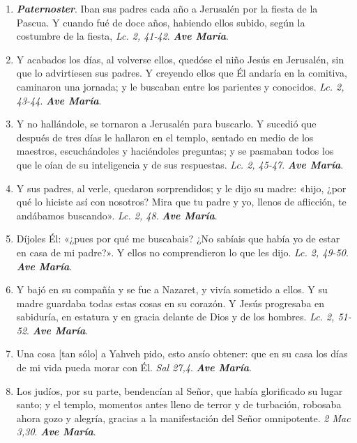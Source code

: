\documentclass[../../devocionario.tex]{subfiles}
\begin{document}
    \begin{enumerate}
        \item \textbf{\textit{Paternoster}}. Iban sus padres cada año a Jerusalén por la fiesta de la Pascua. 
            Y cuando fué de doce años, habiendo ellos subido, según la costumbre de la fiesta, \textit{Lc. 2, 41-42}. \textbf{\textit{Ave María}}.

        \item Y acabados los días, al volverse ellos, quedóse el niño Jesús en Jerusalén, sin que lo advirtiesen sus padres. 
            Y creyendo ellos que Él andaría en la comitiva, caminaron una jornada; 
            y le buscaban entre los parientes y conocidos. \textit{Lc. 2, 43-44}. \textbf{\textit{Ave María}}.

        \item Y no hallándole, se tornaron a Jerusalén para buscarlo. Y sucedió que después de tres días le hallaron en el templo, 
            sentado en medio de los maestros, escuchándoles y haciéndoles preguntas; 
            y se pasmaban todos los que le oían de su inteligencia y de sus respuestas. \textit{Lc. 2, 45-47}. \textbf{\textit{Ave María}}.

        \item Y sus padres, al verle, quedaron sorprendidos; y le dijo su madre: «hijo, ¿por qué lo hiciste así con nosotros? 
            Mira que tu padre y yo, llenos de aflicción, te andábamos buscando». \textit{Lc. 2, 48}. \textbf{\textit{Ave María}}.

        \item Díjoles Él: «¿pues por qué me buscabais? ¿No sabíais que había yo de estar en casa de mi padre?». 
            Y ellos no comprendieron lo que les dijo. \textit{Lc. 2, 49-50}. \textbf{\textit{Ave María}}.

        \item Y bajó en su compañía y se fue a Nazaret, y vivía sometido a ellos. Y su madre guardaba todas estas cosas en su corazón. 
            Y Jesús progresaba en sabiduría, en estatura y en gracia delante de Dios y de los hombres. \textit{Lc. 2, 51-52}. \textbf{\textit{Ave María}}.

        \item Una cosa [tan sólo] a Yahveh pido, esto ansío obtener: que en su casa los días de mi vida pueda morar con Él. \textit{Sal 27,4}. \textbf{\textit{Ave María}}.

        \item Los judíos, por su parte, bendencían al Señor, que había glorificado su lugar santo; y el templo, momentos antes lleno de terror y de turbación, 
            robosaba ahora gozo y alegría, gracias a la manifestación del Señor omnipotente. \textit{2 Mac 3,30}. \textbf{\textit{Ave María}}.


\end{enumerate}
\end{document}
